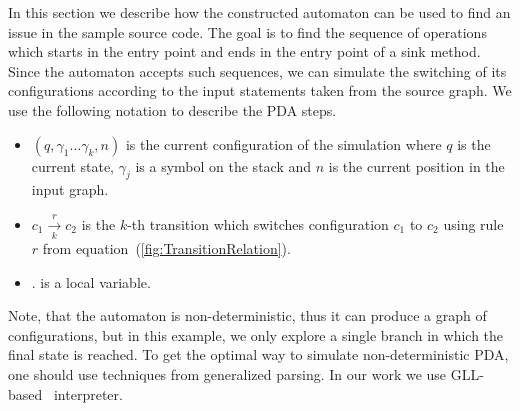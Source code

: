 In this section we describe how the constructed automaton can be used to find an issue in the sample source code.
The goal is to find the sequence of operations which starts in the entry point and ends in the entry point of a sink method.
Since the automaton accepts such sequences, we can simulate the switching of its configurations according to the input statements taken from the source graph.
We use the following notation to describe the PDA steps.
\begin{itemize}
\item $(q, \gamma_1 \ldots \gamma_k, n)$ is the current configuration of the simulation where $q$ is the current state, $\gamma_j$ is a symbol on the stack and $n$ is the current position in the input graph.
\item $c_1 \xrightarrow[k]{r} c_2$ is the $k$-th transition which switches configuration $c_1$ to $c_2$ using rule $r$ from equation~(\ref{fig:TransitionRelation}).
\item {}. is a local variable.
\end{itemize}
Note, that the automaton is non-deterministic, thus it can produce a graph of configurations, but in this example, we only explore a single branch in which the final state is reached.
To get the optimal way to simulate non-deterministic PDA, one should use techniques from generalized parsing.
In our work we use GLL-based~\cite{scott2010gll, GrigorevR16} interpreter.

